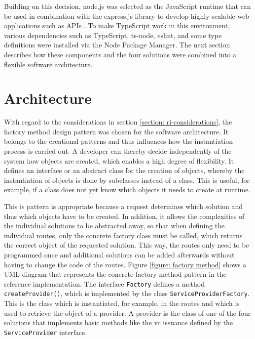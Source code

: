     Building on this decision, node.js was selected as the JavaScript runtime that can be used in combination with the express.js library to develop highly scalable web applications such as APIs \cite{openjs_foundation_about_2021, openjs_foundation_express_2021}. To make TypeScript work in this environment, various dependencies such as TypeScript, ts-node, eslint, and some type definitions were installed via the Node Package Manager. The next section describes how these components and the four solutions were combined into a flexible software architecture.
    
    \section{Architecture}\label{section: architecture}
    
    With regard to the considerations in section \ref{section: ri-considerations}, the factory method design pattern was chosen for the software architecture. It belongs to the creational patterns and thus influences how the instantiation process is carried out. A developer can thereby decide independently of the system how objects are created, which enables a high degree of flexibility. It defines an interface or an abstract class for the creation of objects, whereby the instantiation of objects is done by subclasses instead of a class. This is useful, for example, if a class does not yet know which objects it needs to create at runtime. \cite[pp. 81, 85, 107-108]{gamma_design_1995} 
    
    This is pattern is appropriate because a request determines which solution and thus which objects have to be created. In addition, it allows the complexities of the individual solutions to be abstracted away, so that when defining the individual routes, only the concrete factory class must be called, which returns the correct object of the requested solution. This way, the routes only need to be programmed once and additional solutions can be added afterwards without having to change the code of the routes. Figure \ref{figure: factory method} shows a UML diagram that represents the concrete factory method pattern in the reference implementation. The interface \texttt{Factory} defines a method \texttt{createProvider()}, which is implemented by the class \texttt{ServiceProviderFactory}. This is the class which is instantiated, for example, in the routes and which is used to retrieve the object of a provider. A provider is the class of one of the four solutions that implements basic methods like the \ac{vc} issuance defined by the \texttt{ServiceProvider} interface.
    
